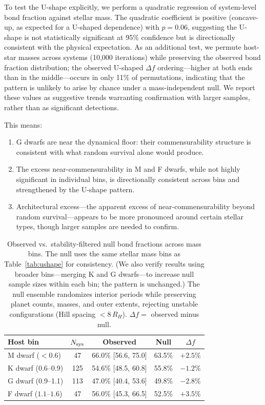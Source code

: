 \documentclass[twocolumn,usenatbib]{mnras}
\begin{document}
To test the U-shape explicitly, we perform a quadratic regression of
system-level bond fraction against stellar mass. The quadratic coefficient is
positive (concave-up, as expected for a U-shaped dependence) with $p = 0.06$,
suggesting the U-shape is not statistically significant at 95\% confidence but
is directionally consistent with the physical expectation. As an additional test, we permute host-star
masses across systems (10,000 iterations) while preserving the observed bond
fraction distribution; the observed U-shaped $\Delta f$ ordering---higher at
both ends than in the middle---occurs in only 11\% of permutations,
indicating that the pattern is unlikely to arise by chance under a
mass-independent null. We report these values as suggestive trends warranting
confirmation with larger samples, rather than as significant detections.

This means:
\begin{enumerate}
  \item G dwarfs are near the dynamical floor: their commensurability
        structure is consistent with what random survival alone would produce.
  \item The excess near-commensurability in M and F dwarfs, while not highly
        significant in individual bins, is directionally consistent across bins
        and strengthened by the U-shape pattern.
  \item Architectural excess---the apparent excess of near-commensurability
        beyond random survival---appears to be more pronounced around
        certain stellar types, though larger samples are needed to confirm.
\end{enumerate}

\begin{table}
\centering
\caption{Observed vs.\ stability-filtered null bond fractions across mass bins.
The null uses the same stellar mass bins as Table~\ref{tab:ushape} for consistency.
(We also verify results using broader bins---merging K and G dwarfs---to increase
null sample sizes within each bin; the pattern is unchanged.) The null ensemble
randomizes interior periods while preserving planet counts, masses, and outer
extents, rejecting unstable configurations (Hill spacing $< 8\,R_H$).
$\Delta f =$ observed minus null.}
\label{tab:null}
\begin{tabular}{lcccc}
\hline
Host bin & $N_{\rm sys}$ & Observed & Null & $\Delta f$\\
\hline
M dwarf ($<0.6$) & 47 & 66.0\% [56.6, 75.0] & 63.5\% & $+2.5\%$\\
K dwarf (0.6--0.9) & 125 & 54.6\% [48.5, 60.8] & 55.8\% & $-1.2\%$\\
G dwarf (0.9--1.1) & 113 & 47.0\% [40.4, 53.6] & 49.8\% & $-2.8\%$\\
F dwarf ($1.1$--$1.6$) & 47 & 56.0\% [45.3, 66.5] & 52.5\% & $+3.5\%$\\
\hline
\end{tabular}
\end{table}
\end{document}
